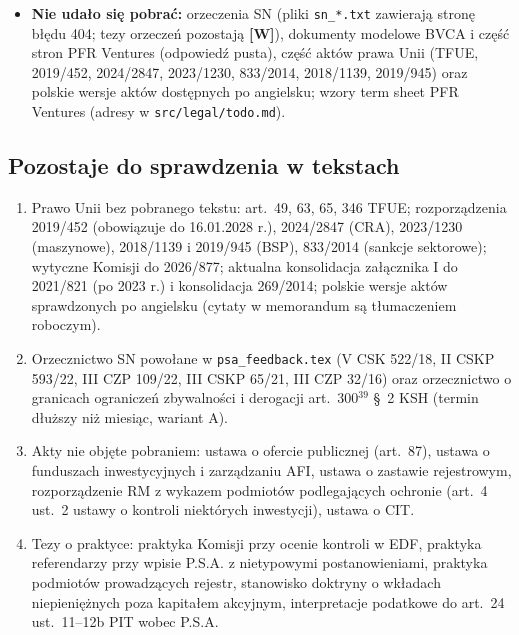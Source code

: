 \documentclass[12pt,a4paper]{report}
\newcommand{\Wiar}[1]{\textbf{[#1]}}
\begin{document}
\begin{itemize}
  \item \textbf{Nie udało się pobrać:} orzeczenia SN (pliki \texttt{sn\_*.txt} zawierają stronę błędu 404; tezy orzeczeń pozostają \Wiar{W}), dokumenty modelowe BVCA i część stron PFR Ventures (odpowiedź pusta), część aktów prawa Unii (TFUE, 2019/452, 2024/2847, 2023/1230, 833/2014, 2018/1139, 2019/945) oraz polskie wersje aktów dostępnych po angielsku; wzory term sheet PFR Ventures (adresy w \texttt{src/legal/todo.md}).
\end{itemize}

\subsection*{Pozostaje do sprawdzenia w tekstach}
\begin{enumerate}
  \item Prawo Unii bez pobranego tekstu: art.~49, 63, 65, 346 TFUE; rozporządzenia 2019/452 (obowiązuje do 16.01.2028 r.), 2024/2847 (CRA), 2023/1230 (maszynowe), 2018/1139 i 2019/945 (BSP), 833/2014 (sankcje sektorowe); wytyczne Komisji do 2026/877; aktualna konsolidacja załącznika I do 2021/821 (po 2023 r.) i konsolidacja 269/2014; polskie wersje aktów sprawdzonych po angielsku (cytaty w memorandum są tłumaczeniem roboczym).
  \item Orzecznictwo SN powołane w \texttt{psa\_feedback.tex} (V CSK 522/18, II CSKP 593/22, III CZP 109/22, III CSKP 65/21, III CZP 32/16) oraz orzecznictwo o granicach ograniczeń zbywalności i derogacji art.~300$^{39}$ §~2 KSH (termin dłuższy niż miesiąc, wariant A).
  \item Akty nie objęte pobraniem: ustawa o ofercie publicznej (art.~87), ustawa o funduszach inwestycyjnych i zarządzaniu AFI, ustawa o zastawie rejestrowym, rozporządzenie RM z wykazem podmiotów podlegających ochronie (art.~4 ust.~2 ustawy o kontroli niektórych inwestycji), ustawa o CIT.
  \item Tezy o praktyce: praktyka Komisji przy ocenie kontroli w EDF, praktyka referendarzy przy wpisie P.S.A. z nietypowymi postanowieniami, praktyka podmiotów prowadzących rejestr, stanowisko doktryny o wkładach niepieniężnych poza kapitałem akcyjnym, interpretacje podatkowe do art.~24 ust.~11--12b PIT wobec P.S.A.
\end{enumerate}
\end{document}
